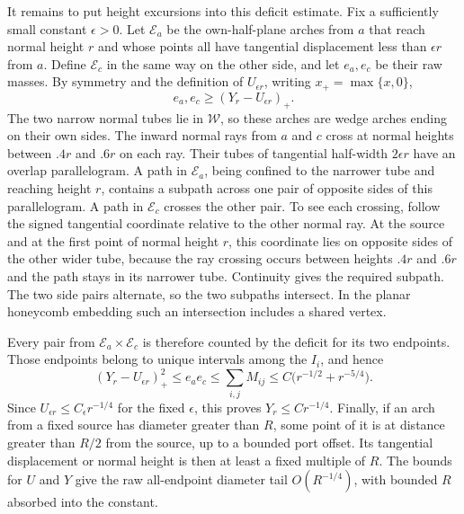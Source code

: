 It remains to put height excursions into this deficit estimate.
Fix a sufficiently small constant $\epsilon>0$. Let $\mathcal E_a$
be the own-half-plane arches from $a$ that reach normal height $r$
and whose points all have tangential displacement less than
$\epsilon r$ from $a$. Define $\mathcal E_c$ in the same way on the
other side, and let $e_a,e_c$ be their raw masses. By symmetry and
the definition of $U_{\epsilon r}$, writing $x_+=\max\{x,0\}$,
\[
             e_a,e_c\ge (Y_r-U_{\epsilon r})_+.
\]
The two narrow normal tubes lie in $\mathcal W$, so these arches are
wedge arches ending on their own sides. The inward normal rays from
$a$ and $c$ cross at normal heights between $.4r$ and $.6r$ on each
ray. Their tubes of tangential half-width $2\epsilon r$ have an overlap
parallelogram. A path in $\mathcal E_a$, being confined to the
narrower tube and reaching height $r$, contains a subpath across one
pair of opposite sides of this parallelogram. A path in
$\mathcal E_c$ crosses the other pair. To see each crossing, follow
the signed tangential coordinate relative to the other normal ray.
At the source and at the first point of normal height $r$, this
coordinate lies on opposite sides of the other wider tube, because
the ray crossing occurs between heights $.4r$ and $.6r$ and the path
stays in its narrower tube. Continuity gives the required subpath.
The two side pairs alternate,
so the two subpaths intersect. In the planar honeycomb embedding
such an intersection includes a shared vertex.

Every pair from $\mathcal E_a\times\mathcal E_c$ is therefore counted
by the deficit for its two endpoints. Those endpoints belong to
unique intervals among the $I_i$, and hence
\[
 (Y_r-U_{\epsilon r})_+^2
       \le e_ae_c
       \le \sum_{i,j}M_{ij}
       \le C\bigl(r^{-1/2}+r^{-5/4}\bigr).
\]
Since $U_{\epsilon r}\le C_\epsilon r^{-1/4}$ for the fixed
$\epsilon$, this proves $Y_r\le C r^{-1/4}$.
Finally, if an arch from a fixed source has diameter greater than
$R$, some point of it is at distance greater than $R/2$ from the
source, up to a bounded port offset. Its tangential displacement or
normal height is then at least a fixed multiple of $R$. The bounds
for $U$ and $Y$ give the raw all-endpoint diameter tail
$O(R^{-1/4})$, with bounded $R$ absorbed into the constant.

